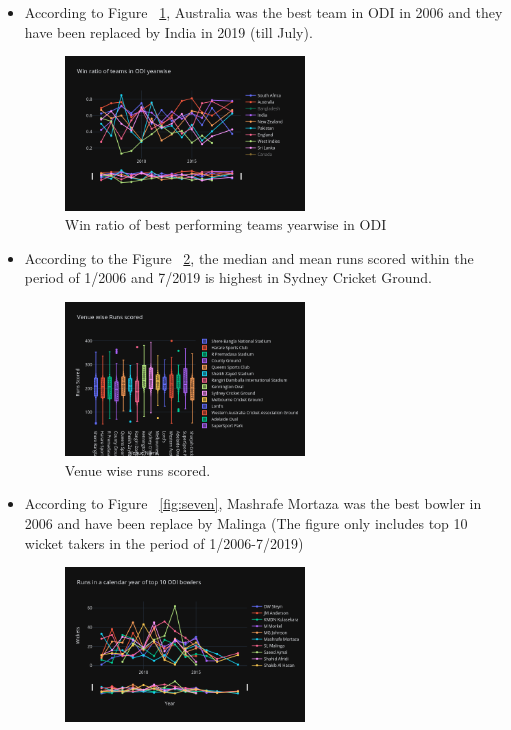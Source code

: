 \documentclass[fleqn,10pt]{wlscirep}
\begin{document}
\begin{itemize}
      \item According to Figure ~\ref{fig:five}, Australia was the best team in ODI in 2006 and they have been replaced by India in 2019 (till July).
      \begin{figure}[h]
        \centering
        \includegraphics[width=0.6\textwidth]{winteams.png}
        \caption{Win ratio of best performing teams yearwise in ODI}
        \label{fig:five}
      \end{figure}
      \item According to the Figure ~\ref{fig:six}, the median and mean runs scored within the period of 1/2006 and 7/2019 is highest in Sydney Cricket Ground.
      \begin{figure}[h]
        \centering
        \includegraphics[width=0.6\textwidth]{venueruns.png}
        \caption{Venue wise runs scored.}
        \label{fig:six}
      \end{figure}
      \item According to Figure ~\ref{fig:seven}, Mashrafe Mortaza was the best bowler in 2006 and have been replace by Malinga (The figure only includes top 10 wicket takers in the period of 1/2006-7/2019)
      \begin{figure}[h]
        \centering
        \includegraphics[width=0.6\textwidth]{wicbowlers.png}

\end{figure}
\end{itemize}
\end{document}
